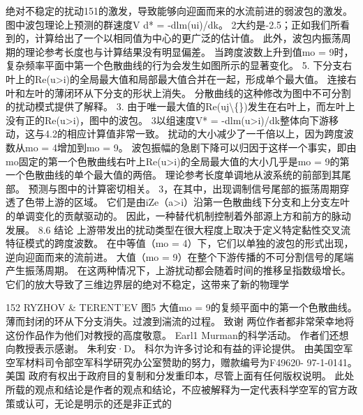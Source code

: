 \documentclass[UTF8,11pt,a4paper,openany,fontset=fandol]{ctexbook}
\begin{document}
绝对不稳定的扰动151的激发，导致能够向迎面而来的水流前进的弱波包的激发。 图中波包理论上预测的群速度V d* = -dlm(ui)/dk。 2大约是-2.5；正如我们所看到的，计算给出了一个以相同值为中心的更广泛的估计值。 此外，波包内振荡周期的理论参考长度也与计算结果没有明显偏差。 当跨度波数上升到值mo = 9时，复杂频率平面中第一个色散曲线的行为会发生如图所示的显著变化。 5. 下分支右叶上的Re(u>i)的全局最大值和局部最大值合并在一起，形成单个最大值。 连接右叶和左叶的薄闭环从下分支的形状上消失。 分散曲线的这种修改为图中不可分割的扰动模式提供了解释。 3. 由于唯一最大值的Re(uj\textbackslash\{\})发生在右叶上，而左叶上没有正的Re(u>i)，图中的波包。 3以组速度V* = -dlm(u>i)/dk整体向下游移动，这与4.2的相应计算值非常一致。 扰动的大小减少了一千倍以上，因为跨度波数从mo = 4增加到mo = 9。 波包振幅的急剧下降可以归因于这样一个事实，即由mo固定的第一个色散曲线右叶上Re(u>i)的全局最大值的大小几乎是mo = 9的第一个色散曲线的单个最大值的两倍。 理论参考长度单调地从波系统的前部到其尾部。 预测与图中的计算密切相关。 3，在其中，出现调制信号尾部的振荡周期穿透了色带上游的区域。 它们是由iZe（a>i）沿第一色散曲线下分支和上分支左叶的单调变化的贡献驱动的。 因此，一种替代机制控制着外部源上方和前方的脉动发展。 8.6 结论 上游带发出的扰动类型在很大程度上取决于定义特定黏性交叉流特征模式的跨度波数。 在中等值（mo = 4）下，它们以单独的波包的形式出现，逆向迎面而来的流前进。 大值（mo = 9）在整个下游传播的不可分割信号的尾端产生振荡周期。 在这两种情况下，上游扰动都会随着时间的推移呈指数级增长。 它们的放大导致了三维边界层的绝对不稳定，这带来了新的物理学

152 RYZHOV \& TERENT'EV 图5 大值mo = 9的复频平面中的第一个色散曲线。 薄而封闭的环从下分支消失。过渡到湍流的过程。 致谢 两位作者都非常荣幸地将这份作品作为他们对教授的高度敬意。 Earl1 Murman的科学活动。 作者们还想向教授表示感谢。 朱利安·D。 科尔为许多讨论和有益的评论提供。 由美国空军空军材料司令部空军科学研究办公室赞助的努力，赠款编号为F49620- 97-1-0141。 美国 政府有权出于政府目的复制和分发重印本，尽管上面有任何版权说明。 此处所载的观点和结论是作者的观点和结论，不应被解释为一定代表科学空军的官方政策或认可，无论是明示的还是非正式的
\end{document}
